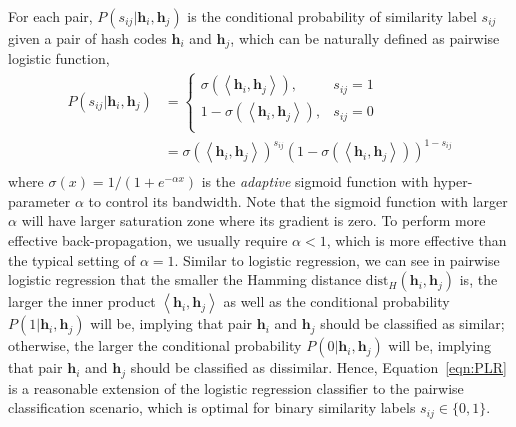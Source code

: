 \documentclass[10pt,twocolumn,letterpaper]{article}
\begin{document}
For each pair, $P(s_{ij}|{\bm h}_i,{\bm h}_j)$ is the conditional probability of similarity label $s_{ij}$ given a pair of hash codes ${\bm h}_i$ and ${\bm h}_j$, which can be naturally defined as pairwise logistic function,
\begin{equation}\label{eqn:PLR}
	\begin{aligned}
	P\left( {{s_{ij}}|{{\bm{h}}_i},{{\bm{h}}_j}} \right) &= 
		\begin{cases}
			\sigma \left( {\left\langle {{\bm{h}}_i, {\bm{h}}_j} \right\rangle } \right), & {s_{ij}} = 1 \\
			1 - \sigma \left( {\left\langle {{\bm{h}}_i, {\bm{h}}_j} \right\rangle } \right), & {s_{ij}} = 0 \\
		\end{cases} \\
		& = \sigma{\left( {\left\langle {{\bm{h}}_i,{\bm{h}}_j} \right\rangle } \right)^{{s_{ij}}}}{\left( {1 - \sigma \left( {\left\langle {{\bm{h}}_i,{\bm{h}}_j} \right\rangle } \right)} \right)^{1 - {s_{ij}}}} \\
	\end{aligned}
\end{equation}
where $\sigma \left( x \right) = {1}/({{1 + {e^{ - \alpha x}}}})$ is the \emph{adaptive} sigmoid function with hyper-parameter $\alpha$ to control its bandwidth. Note that the sigmoid function with larger $\alpha$ will have larger saturation zone where its gradient is zero. To perform more effective back-propagation, we usually require $\alpha < 1$, which is more effective than the typical setting of $\alpha = 1$. Similar to logistic regression, we can see in pairwise logistic regression that the smaller the Hamming distance ${\text{dis}}{{\textrm{t}}_H}\left( {{{\bm{h}}_i},{{\bm{h}}_j}} \right)$ is, the larger the inner product ${\left\langle {{{\bm{h}}_i},{{\bm{h}}_j}} \right\rangle }$ as well as the conditional probability $P\left( {1|{{\bm{h}}_i},{{\bm{h}}_j}} \right)$ will be, implying that pair ${\bm h}_i$ and ${\bm h}_j$ should be classified as similar; otherwise, the larger the conditional probability $P\left( {0|{{\bm{h}}_i},{{\bm{h}}_j}} \right)$ will be, implying that pair ${\bm h}_i$ and ${\bm h}_j$ should be classified as dissimilar. Hence, Equation~\eqref{eqn:PLR} is a reasonable extension of the logistic regression classifier to the pairwise classification scenario, which is optimal for binary similarity labels $s_{ij}\in\{0,1\}$.
\end{document}
